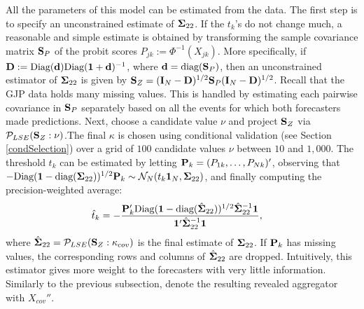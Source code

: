 \documentclass[11pt]{article}
\newcommand{\PP}{{\bf P}}
\renewcommand{\P}{\mathbb{P}}
\theoremstyle{definition}
\theoremstyle{definition}
\def\one{{\bf 1}}
\def\bSigma{{\bf \Sigma}}
\def\dd{{\bf d}}
\def\D{{\bf D}}
\def\SS{{\bf S}}
\def\I{{\bf I}}
\def\P{{\mathbb P}}
\def\Cov{{\rm Cov}\,}
\def\diag{\text{diag}}
\def\Diag{\text{Diag}}
\def\diag{\text{diag}}
\begin{document}


All the parameters of this model can be estimated from the data. The first step is to specify an unconstrained estimate of $\bSigma_{22}$. If the $t_k$'s do not change much, a reasonable and simple estimate is obtained  by transforming the sample covariance matrix  $\SS_P$ of the probit scores $P_{jk} := \Phi^{-1}(X_{jk})$. More specifically,  if $\D := \Diag( \dd ) \Diag(\one + \dd)^{-1}$, where $\dd = \diag(\SS_P)$, then an unconstrained estimator of $\bSigma_{22}$ is given by $\SS_Z = (\I_N-\D)^{1/2} \SS_P (\I_N-\D)^{1/2}$. Recall that the GJP data holds many missing values. This is handled by estimating each pairwise covariance in $\SS_P$ separately based on all the events for which both forecasters made predictions. 
Next, choose a candidate value $\nu$ and project $\SS_Z$ via $\mathcal{P}_{LSE}(\SS_Z : \nu)$.The final $\kappa$ is chosen using conditional validation (see Section \ref{condSelection}) over a grid of $100$ candidate values $\nu$ between $10$ and $1,000$. 
The threshold $t_k$ can be estimated by letting $\PP_k = (P_{1k}, \dots, P_{Nk})'$, observing that $-\Diag(\one-\diag(\bSigma_{22}))^{1/2}\PP_{k} \sim \mathcal{N}_N(t_k \one_N, \bSigma_{22})$,
% 
and finally computing the precision-weighted average: 
\begin{align*}
\hat{t}_k &= -\frac{\PP_{k}' \Diag(\one-\diag(\hat{\bSigma}_{22}))^{1/2} \hat{\bSigma}_{22}^{-1} \one}{\one' \hat{\bSigma}_{22}^{-1} \one},
\end{align*}
where $\hat{\bSigma}_{22} = \mathcal{P}_{LSE}(\SS_Z : \kappa_{cov})$ is the final estimate of $\bSigma_{22}$. If $\PP_k$ has missing values, the corresponding rows and columns of $\hat{\bSigma}_{22}$ are dropped. Intuitively, this estimator gives more weight to the forecasters with very little information. Similarly to the previous subsection, denote the resulting revealed aggregator with $X_{cov}''$. 
\end{document}
